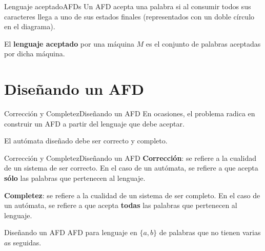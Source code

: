\documentclass[spanish]{beamer}
\newcommand\blfootnote[1]{%
  \begingroup
  \renewcommand\thefootnote{}\footnote{#1}%
  \addtocounter{footnote}{-1}%
  \endgroup
}
\begin{document}
\begin{frame}{Lenguaje aceptado}{AFDs}
    Un AFD \alert{acepta} una palabra si al consumir todos sus caracteres llega a uno de sus estados finales (representados con un doble círculo en el diagrama). \pause
    
    \bigskip

    El \textbf{lenguaje aceptado} por una máquina $M$ es el conjunto de palabras aceptadas por dicha máquina.
\end{frame}

\section{Diseñando un AFD}
\label{sec:afd-design}

\begin{frame}{Corrección y Completez}{Diseñando un AFD}
    En ocasiones, el problema radica en construir un AFD a partir del lenguaje que debe aceptar. \pause

    \bigskip

    El autómata diseñado debe ser \alert{correcto} y \alert{completo}.
\end{frame}

\begin{frame}{Corrección y Completez}{Diseñando un AFD}
    \textbf{Corrección}: se refiere a la cualidad de un sistema de ser \alert{correcto}. En el caso de un autómata, se refiere a que acepta \textbf{sólo} las palabras que pertenecen al lenguaje. \pause

    \bigskip
    
    \textbf{Completez}: se refiere a la cualidad de un sistema de ser \alert{completo}. En el caso de un autómata, se refiere a que acepta \textbf{todas} las palabras que pertenecen al lenguaje.
\end{frame}

\begin{frame}{Diseñando un AFD}
    AFD para lenguaje en $\{a,b\}$ de palabras que no tienen varias $a$s seguidas.

    \begin{center}
    \end{center}
\end{frame}
\end{document}
